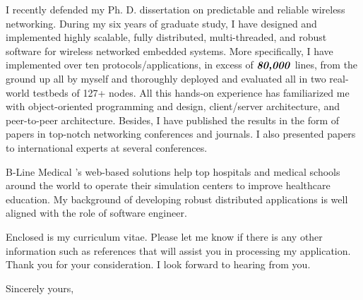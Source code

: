\documentclass[11pt]{letter} %
\newcommand{\company}{B-Line Medical}
\begin{document}
\begin{letter}
I recently defended my Ph. D. dissertation on predictable and reliable wireless networking. During my six years of graduate study, I have designed and implemented highly scalable, fully distributed, multi-threaded, and robust software for wireless networked embedded systems. More specifically, I have implemented over ten protocols/applications, in excess of $\textbf{\textit{80,000}}$ lines, from the ground up all by myself and thoroughly deployed and evaluated all in two real-world testbeds of 127+ nodes. All this hands-on experience has familiarized me with object-oriented programming and design, client/server architecture, and peer-to-peer architecture.
Besides, I have published the results in the form of papers in top-notch networking conferences and journals. I also presented papers to international experts at several conferences.

\company{} 
's web-based solutions help top hospitals and medical schools around the world to operate their simulation centers to improve healthcare education.
My background of developing 
robust
distributed applications is well aligned with the role of software engineer.
 
Enclosed is my curriculum vitae. Please let me know if there is any other information such as references that will assist you in processing my application. Thank you for your consideration. I look forward to hearing from you.

\closing{Sincerely yours,}


\end{letter}
\end{document}
